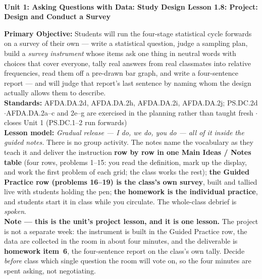 \documentclass[10pt]{article}
\newcommand{\UnitNumberName}{Unit 1: Asking Questions with Data: Study Design \quad}
\newcommand{\LessonNumberName}{Lesson 1.8: Project: Design and Conduct a Survey}
\begin{document}
\begin{center}
    {\Large\bfseries \CourseName \\
    {\small\bfseries \UnitNumberName \LessonNumberName}}
\end{center}

\begin{tcolorbox}[colback=frost, colframe=cerulean, boxrule=0.9pt, arc=2mm,
    left=2mm, right=2mm, top=1.5mm, bottom=1.5mm]
    \textbf{Primary Objective:} Students will run the four-stage statistical cycle forwards on a
    survey of their own --- write a statistical question, judge a sampling plan, build a
    \emph{survey instrument} whose items ask one thing in neutral words with choices that cover
    everyone, tally real answers from real classmates into relative frequencies, read them off a
    pre-drawn bar graph, and write a four-sentence report --- and will judge that report's last
    sentence by naming whom the design actually allows them to describe.
    \\[2pt]
    \textbf{Standards:} AFDA.DA.2d, AFDA.DA.2h, AFDA.DA.2i, AFDA.DA.2j; PS.DC.2d
    \quad$\cdot$\quad AFDA.DA.2a--c and 2e--g are exercised in the planning rather than taught
    fresh \quad$\cdot$\quad closes Unit 1 (PS.DC.1--2 run forwards)
    \\[2pt]
    \textbf{Lesson model:} \emph{Gradual release --- I do, we do, you do --- all of it inside the
    guided notes.} There is no group activity. The notes name the vocabulary as they teach it and
    deliver the instruction \textbf{row by row in one Main Ideas / Notes table} (four rows,
    problems 1--15: you read the definition, mark up the display, and work the first problem of
    each grid; the class works the rest); \textbf{the Guided Practice row (problems 16--19) is the
    class's own survey}, built and tallied live with students holding the pen; \textbf{the homework
    is the individual practice}, and students start it in class while you circulate. The whole-class
    debrief is \emph{spoken}.
    \\[2pt]
    \textbf{Note --- this is the unit's project lesson, and it is one lesson.} The project is not a
    separate week: the instrument is built in the Guided Practice row, the data are collected in the
    room in about four minutes, and the deliverable is \textbf{homework item~6}, the four-sentence
    report on the class's own tally. Decide \emph{before} class which single question the room will
    vote on, so the four minutes are spent asking, not negotiating.
\end{tcolorbox}
\end{document}
